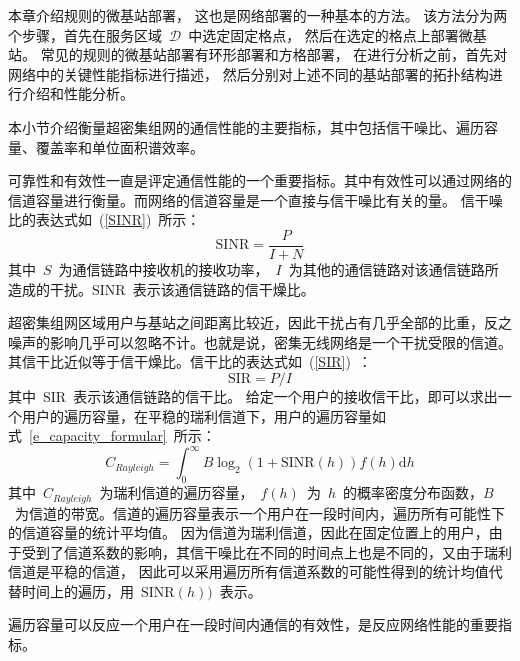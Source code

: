 

本章介绍规则的微基站部署，
这也是网络部署的一种基本的方法。
该方法分为两个步骤，首先在服务区域~$\mathcal{D}$~中选定固定格点，
然后在选定的格点上部署微基站。
常见的规则的微基站部署有环形部署和方格部署，
在进行分析之前，首先对网络中的关键性能指标进行描述，
然后分别对上述不同的基站部署的拓扑结构进行介绍和性能分析。

本小节介绍衡量超密集组网的通信性能的主要指标，其中包括信干噪比、遍历容量、覆盖率和单位面积谱效率。


可靠性和有效性一直是评定通信性能的一个重要指标。其中有效性可以通过网络的信道容量进行衡量。而网络的信道容量是一个直接与信干噪比有关的量。
信干噪比的表达式如~(\ref{SINR})~所示：
\begin{equation}\label{SINR}
  \mathrm{SINR}=\frac{P}{I+N}
\end{equation}
其中~$S$~为通信链路中接收机的接收功率，~$I$~为其他的通信链路对该通信链路所造成的干扰。$\mathrm{SINR}$~表示该通信链路的信干燥比。

超密集组网区域用户与基站之间距离比较近，因此干扰占有几乎全部的比重，反之噪声的影响几乎可以忽略不计。也就是说，密集无线网络是一个干扰受限的信道。其信干比近似等于信干燥比。信干比的表达式如~(\ref{SIR})~：
\begin{equation}\label{SIR}
  \mathrm{SIR}=P/I
\end{equation}
其中~$\mathrm{SIR}$~表示该通信链路的信干比。
给定一个用户的接收信干比，即可以求出一个用户的遍历容量，在平稳的瑞利信道下，用户的遍历容量如式~\ref{e_capacity_formular}~所示：
\begin{equation}\label{e_capacity_formular}
  C_{Rayleigh} = \int_{0}^{\infty} B \log_2(1+\mathrm{SINR}(h)) f(h) \mathrm{d} h
\end{equation}
其中~$C_{Rayleigh}$~为瑞利信道的遍历容量，~$f(h)$~为~$h$~的概率密度分布函数，$B$~为信道的带宽。信道的遍历容量表示一个用户在一段时间内，遍历所有可能性下的信道容量的统计平均值。
因为信道为瑞利信道，因此在固定位置上的用户，由于受到了信道系数的影响，其信干噪比在不同的时间点上也是不同的，又由于瑞利信道是平稳的信道，
因此可以采用遍历所有信道系数的可能性得到的统计均值代替时间上的遍历，用~$\mathrm{SINR}(h))$~表示。

遍历容量可以反应一个用户在一段时间内通信的有效性，是反应网络性能的重要指标。

